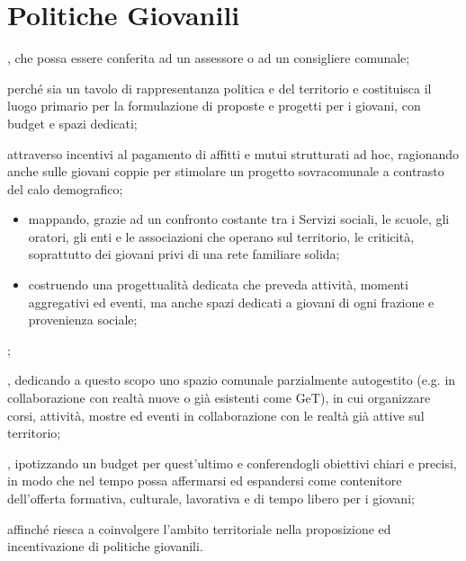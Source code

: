\section{Politiche Giovanili}
, che possa essere conferita ad un assessore o ad un consigliere comunale;

 perché sia un tavolo di rappresentanza politica e del territorio e costituisca il luogo primario per la formulazione di proposte e progetti per i giovani, con budget e spazi dedicati; 

 attraverso incentivi al pagamento di affitti e mutui strutturati ad hoc, ragionando anche sulle giovani coppie per stimolare un progetto sovracomunale a contrasto del calo demografico;

\begin{bluebox}
\begin{itemize}
  \item mappando, grazie ad un confronto costante tra i Servizi sociali, le scuole, gli oratori, gli enti e le associazioni che operano sul territorio, le criticità, soprattutto dei giovani privi di una rete familiare solida;
  \item costruendo una progettualità dedicata che preveda attività, momenti aggregativi ed eventi, ma anche spazi dedicati a giovani di ogni frazione e provenienza sociale;
\end{itemize}
\end{bluebox}

; 

, dedicando a questo scopo uno spazio comunale parzialmente autogestito (e.g. in collaborazione con realtà nuove o già esistenti come GeT), in cui organizzare corsi, attività, mostre ed eventi in collaborazione con le realtà già attive sul territorio;

, ipotizzando un budget per quest'ultimo e conferendogli obiettivi chiari e precisi, in modo che nel tempo possa affermarsi ed espandersi come contenitore dell'offerta formativa, culturale, lavorativa e di tempo libero per i giovani;

 affinché riesca a coinvolgere l'ambito territoriale nella proposizione ed incentivazione di politiche giovanili.
